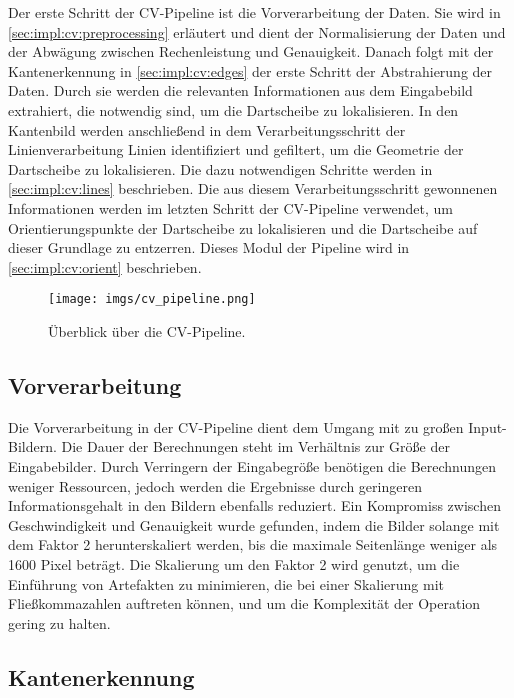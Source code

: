 Der erste Schritt der CV-Pipeline ist die Vorverarbeitung der Daten. Sie wird in \autoref{sec:impl:cv:preprocessing} erläutert und dient der Normalisierung der Daten und der Abwägung zwischen Rechenleistung und Genauigkeit. Danach folgt mit der Kantenerkennung in \autoref{sec:impl:cv:edges} der erste Schritt der Abstrahierung der Daten. Durch sie werden die relevanten Informationen aus dem Eingabebild extrahiert, die notwendig sind, um die Dartscheibe zu lokalisieren. In den Kantenbild werden anschließend in dem Verarbeitungsschritt der Linienverarbeitung Linien identifiziert und gefiltert, um die Geometrie der Dartscheibe zu lokalisieren. Die dazu notwendigen Schritte werden in \autoref{sec:impl:cv:lines} beschrieben. Die aus diesem Verarbeitungsschritt gewonnenen Informationen werden im letzten Schritt der CV-Pipeline verwendet, um Orientierungspunkte der Dartscheibe zu lokalisieren und die Dartscheibe auf dieser Grundlage zu entzerren. Dieses Modul der Pipeline wird in \autoref{sec:impl:cv:orient} beschrieben.

\begin{figure}
    \centering
    \texttt{[image: imgs/cv\_pipeline.png]}
    \caption{Überblick über die CV-Pipeline.}
    \label{img:cv_pipeline}
\end{figure}

\subsection{Vorverarbeitung}
\label{sec:impl:cv:preprocessing}

Die Vorverarbeitung in der CV-Pipeline dient dem Umgang mit zu großen Input-Bildern. Die Dauer der Berechnungen steht im Verhältnis zur Größe der Eingabebilder. Durch Verringern der Eingabegröße benötigen die Berechnungen weniger Ressourcen, jedoch werden die Ergebnisse durch geringeren Informationsgehalt in den Bildern ebenfalls reduziert. Ein Kompromiss zwischen Geschwindigkeit und Genauigkeit wurde gefunden, indem die Bilder solange mit dem Faktor 2 herunterskaliert werden, bis die maximale Seitenlänge weniger als 1600 Pixel beträgt. Die Skalierung um den Faktor 2 wird genutzt, um die Einführung von Artefakten zu minimieren, die bei einer Skalierung mit Fließkommazahlen auftreten können, und um die Komplexität der Operation gering zu halten.

\subsection{Kantenerkennung}
\label{sec:impl:cv:edges}

